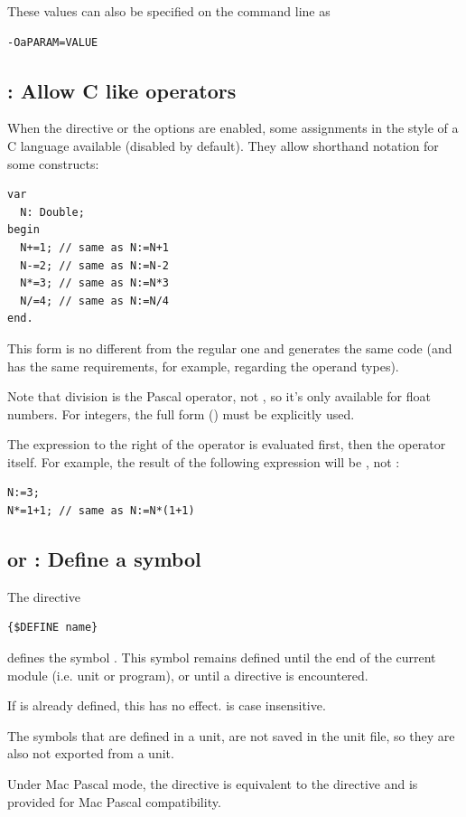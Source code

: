 These values can also be specified on the command line as
\begin{verbatim}
-OaPARAM=VALUE
\end{verbatim}

\subsection{ : Allow C like operators}
When the  directive or the  options are enabled,
some assignments in the style of a C language available (disabled by default).
They allow shorthand notation for some constructs:
\begin{verbatim}
var
  N: Double;
begin
  N+=1; // same as N:=N+1
  N-=2; // same as N:=N-2
  N*=3; // same as N:=N*3
  N/=4; // same as N:=N/4
end.
\end{verbatim}

This form is no different from the regular one and generates the same code
(and has the same requirements, for example, regarding the operand types).

Note that division is the Pascal \var{/} operator, not , so it's only
available for float numbers. For integers, the full form ()
must be explicitly used.

The expression to the right of the operator is evaluated first, then the operator itself.
For example, the result of the following expression will be , not :
\begin{verbatim}
N:=3;
N*=1+1; // same as N:=N*(1+1)
\end{verbatim}

\subsection{ or  : Define a symbol}
The directive
\begin{verbatim}
{$DEFINE name}
\end{verbatim}
defines the symbol . This symbol remains defined until the end of
the current module (i.e. unit or program), or until a  directive is encountered.

If  is already defined, this has no effect.  is case
insensitive.

The symbols that are defined in a unit, are not saved in the unit file,
so they are also not exported from a unit.

Under Mac Pascal mode, the  directive is equivalent to the 
 directive and is provided for Mac Pascal compatibility.

